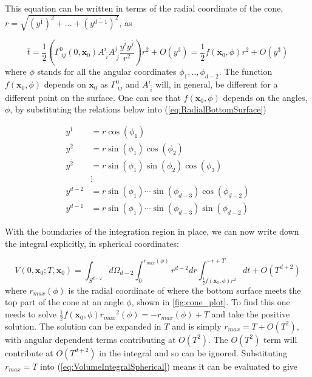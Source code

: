 \documentclass[12pt]{article}
\newcommand{\be}{\begin{equation}}
\newcommand{\ee}{\end{equation}}
\begin{document}
This equation can be written in terms of the radial coordinate of the cone, $r=\sqrt{(y^{\overline{1}})^2+...+(y^{\overline{d-1}})^2}$, as

\be\label{eq:RadialBottomSurface}
\overline{t}=\frac{1}{2}\left(\Gamma^{0}_{\;ij}(0,\mathbf{x}_0)A^{i}_{\;\overline{i}}A^{j}_{\;\overline{j}}\frac{y^{\overline{i}} y^{\overline{j}}}{r^2}\right)r^2+O(y^3)=\frac{1}{2}f(\mathbf{x}_0,\phi)r^2+O(y^3)
\ee
where $\phi$ stands for all the angular coordinates $\phi_1,..,\phi_{d-2}$. The function $f(\mathbf{x}_0,\phi)$ depends on $\mathbf{x}_0$ as $\Gamma^{0}_{\;ij}$ and $A^{i}_{\;\overline{i}}$ will, in general, be different for a different point on the surface. One can see that $f(\mathbf{x}_0,\phi)$ depends on the angles, $\phi$, by substituting the relations below into (\ref{eq:RadialBottomSurface})

\begin{align}\label{eq:SphericalCoords}
y^{\overline{1}} &= r \cos(\phi_1) \nonumber \\
y^{\overline{2}} &= r \sin(\phi_1) \cos(\phi_2) \nonumber \\
y^{\overline{2}} &= r \sin(\phi_1) \sin(\phi_2) \cos(\phi_3) \nonumber \\
    &\vdots \nonumber \\
y^{\overline{d-2}} &= r \sin(\phi_1) \cdots \sin(\phi_{d-3}) \cos(\phi_{d-2}) \nonumber \\
y^{\overline{d-1}} &= r \sin(\phi_1) \cdots \sin(\phi_{d-3}) \sin(\phi_{d-2})
\end{align}

With the boundaries of the integration region in place, we can now write down the integral explicitly, in spherical coordinates:

\be\label{eq:VolumeIntegralSpherical}
V(0,\mathbf{x}_0;T,\mathbf{x}_0)=\int_{S^{d-2}}
d\Omega_{d-2}
\int_{0}^{r_{max}(\phi)}r^{d-2}dr
\int_{\frac{1}{2}f(\mathbf{x}_0,\phi)r^2}^{-r+T}
d\overline{t}+O(T^{d+2})
\ee
where $r_{max}(\phi)$ is the radial coordinate of where the bottom surface meets the top part of the cone at an angle $\phi$, shown in \ref{fig:cone_plot}. To find this one needs to solve $\frac{1}{2}f(\mathbf{x}_0,\phi){r_{max}}^2(\phi)=-r_{max}(\phi)+T$ and take the positive solution. The solution can be expanded in $T$ and is simply $r_{max}=T+O(T^2)$, with angular dependent terms contributing at $O(T^2)$. The $O(T^2)$ term will contribute at $O(T^{d+2})$ in the integral and so can be ignored. Substituting $r_{max}=T$ into (\ref{eq:VolumeIntegralSpherical}) means it can be evaluated to give
\end{document}
